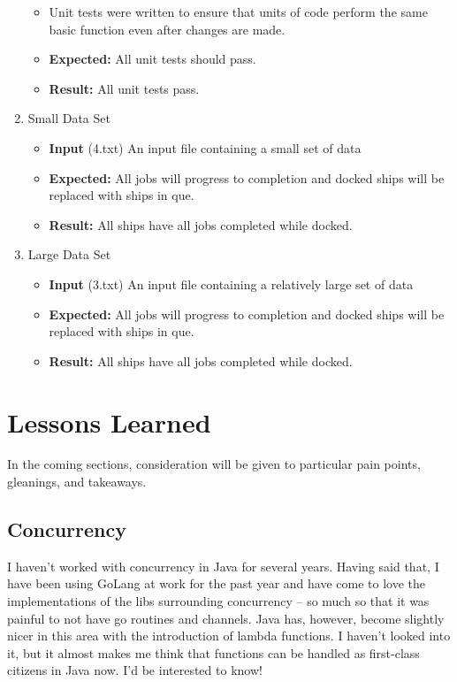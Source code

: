\documentclass[english,floatsintext,man]{apa6}
\providecommand{\tightlist}{%
  \setlength{\itemsep}{0pt}\setlength{\parskip}{0pt}}
\begin{document}
\begin{enumerate}
  \begin{itemize}
  \tightlist
  \item
    Unit tests were written to ensure that units of code perform the
    same basic function even after changes are made.
  \item
    \textbf{Expected:} All unit tests should pass.
  \item
    \textbf{Result:} All unit tests pass.
  \end{itemize}
\item
  Small Data Set

  \begin{itemize}
  \tightlist
  \item
    \textbf{Input} (4.txt) An input file containing a small set of data
  \item
    \textbf{Expected:} All jobs will progress to completion and docked
    ships will be replaced with ships in que.
  \item
    \textbf{Result:} All ships have all jobs completed while docked.
  \end{itemize}
\item
  Large Data Set

  \begin{itemize}
  \tightlist
  \item
    \textbf{Input} (3.txt) An input file containing a relatively large
    set of data
  \item
    \textbf{Expected:} All jobs will progress to completion and docked
    ships will be replaced with ships in que.
  \item
    \textbf{Result:} All ships have all jobs completed while docked.
  \end{itemize}
\end{enumerate}

\section{Lessons Learned}\label{lessons-learned}

In the coming sections, consideration will be given to particular pain
points, gleanings, and takeaways.

\subsection{Concurrency}\label{concurrency}

I haven't worked with concurrency in Java for several years. Having said
that, I have been using GoLang at work for the past year and have come
to love the implementations of the libs surrounding concurrency -- so
much so that it was painful to not have go routines and channels. Java
has, however, become slightly nicer in this area with the introduction
of lambda functions. I haven't looked into it, but it almost makes me
think that functions can be handled as first-class citizens in Java now.
I'd be interested to know!
\end{document}

